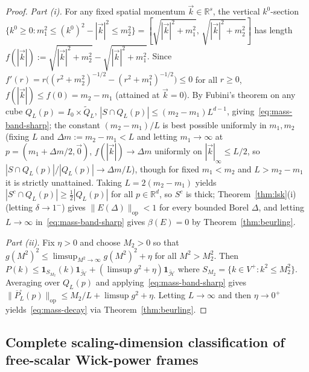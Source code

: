\documentclass[11pt,a4paper]{article}
\theoremstyle{definition}
\theoremstyle{remark}
\newcommand{\tH}{\widetilde{\mathcal{H}}}
\newcommand{\RR}{\mathbb{R}}
\newcommand{\op}{\mathrm{op}}
\newcommand{\one}{\mathbf{1}}
\newcommand{\norm}[1]{\|#1\|}
\begin{document}
\begin{proof}
\emph{Part (i).} For any fixed spatial momentum $\vec{k}\in\RR^s$, the vertical $k^0$-section $\{k^0\ge 0 : m_1^2\le (k^0)^2-|\vec{k}|^2\le m_2^2\} = [\sqrt{|\vec{k}|^2+m_1^2},\,\sqrt{|\vec{k}|^2+m_2^2}]$ has length $f(|\vec{k}|):=\sqrt{|\vec{k}|^2+m_2^2}-\sqrt{|\vec{k}|^2+m_1^2}$. Since $f'(r)=r\bigl((r^2+m_2^2)^{-1/2}-(r^2+m_1^2)^{-1/2}\bigr)\le 0$ for all $r\ge 0$, $f(|\vec{k}|)\le f(0)=m_2-m_1$ (attained at $\vec{k}=0$). By Fubini's theorem on any cube $Q_L(p)=I_0\times\widetilde{Q}_L$, $|S\cap Q_L(p)|\le (m_2-m_1)L^{d-1}$, giving~\eqref{eq:mass-band-sharp}; the constant $(m_2-m_1)/L$ is best possible uniformly in $m_1,m_2$ (fixing $L$ and $\Delta m := m_2-m_1 < L$ and letting $m_1\to\infty$ at $p=(m_1+\Delta m/2,\vec{0})$, $f(|\vec{k}|)\to\Delta m$ uniformly on $|\vec{k}|_\infty\le L/2$, so $|S\cap Q_L(p)|/|Q_L(p)|\to\Delta m/L$), though for fixed $m_1<m_2$ and $L>m_2-m_1$ it is strictly unattained. Taking $L=2(m_2-m_1)$ yields $|S^c\cap Q_L(p)|\ge \frac{1}{2}|Q_L(p)|$ for all $p\in\RR^d$, so $S^c$ is thick; Theorem~\ref{thm:lsk}(i) (letting $\delta\to 1^-$) gives $\norm{E(\Delta)}_{\op}<1$ for every bounded Borel $\Delta$, and letting $L\to\infty$ in~\eqref{eq:mass-band-sharp} gives $\beta(E)=0$ by Theorem~\ref{thm:beurling}.

\emph{Part (ii).} Fix $\eta>0$ and choose $M_2>0$ so that $g(M^2)^2 \le \limsup_{M^2\to\infty}g(M^2)^2+\eta$ for all $M^2>M_2^2$. Then $P(k)\le \one_{S_{M_2}}(k)\one_{\tH} + (\limsup g^2+\eta)\one_{\tH}$ where $S_{M_2}=\{k\in V^+: k^2\le M_2^2\}$. Averaging over $Q_L(p)$ and applying~\eqref{eq:mass-band-sharp} gives $\norm{\overline{P}_L^\square(p)}_{\op}\le M_2/L + \limsup g^2 + \eta$. Letting $L\to\infty$ and then $\eta\to 0^+$ yields~\eqref{eq:mass-decay} via Theorem~\ref{thm:beurling}.
\end{proof}

\subsection{Complete scaling-dimension classification of free-scalar Wick-power frames}
\end{document}
